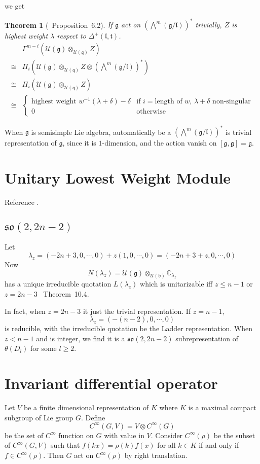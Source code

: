 \documentclass[12pt]{article}
\newtheorem{thm}{Theorem}
\def\bC{{\mathbb{C}}}
\def\aso{\mathfrak{so}}
\def\fbb{\mathfrak{b}}
\def\fll{\mathfrak{l}}
\def\fqq{\mathfrak{q}}
\def\ftt{\mathfrak{t}}
\def\fgg{\mathfrak{g}}
\def\cuu{\mathcal{U}}
\begin{document}
we get
\begin{thm}[\cite{Enright1985}~Proposition~6.2]
If $\fgg$ act on $(\bigwedge^m(\fgg/\fll))^*$ trivially,
$Z$ is highest weight $\lambda$ respect to $\Delta^+(\fll,\ftt)$. 
\[
\begin{split}
 &\Gamma^{m-i}(\cuu(\fgg)\otimes_{\cuu(\fqq)}Z)\\
\cong& \Pi_i(\cuu(\fgg)\otimes_{\cuu(\fqq)}Z \otimes (\bigwedge^m(\fgg/\fll))^*)\\
\cong& \Pi_i(\cuu(\fgg)\otimes_{\cuu(\fqq)}Z)\\
\cong& \begin{cases}
\text{highest weight } w^{-1}(\lambda+\delta)-\delta & \text{if } i=\text{length of $w$, $\lambda+\delta$ non-singular}\\
0 & \text{otherwise}  
\end{cases}
\end{split}
\]
\end{thm}
When $\fgg$ is semisimple Lie algebra, automatically be a $(\bigwedge^m(\fgg/\fll))^*$ is trivial representation of $\fgg$,
since it is $1$-dimension, and the action vanish on $[\fgg,\fgg]=\fgg$.

\section{Unitary Lowest Weight Module}
Reference \cite{Enright1983}.
\subsection{$\aso(2,2n-2)$}
Let 
\[
\lambda_z = (-2n+3, 0,\cdots, 0) + z(1, 0, \cdots, 0)
= (-2n+3+z,0, \cdots, 0)
\]
Now
\[
N(\lambda_z)=\cuu(\fgg)\otimes_{\cuu(\fbb)}\bC_{\lambda_z}
\]
has a unique irreducible quotation $L(\lambda_z)$ which is unitarizable iff $z\leq n-1$ or $z=2n-3$ 
\cite{Enright1983}~Theorem~10.4. 

In fact, when $z=2n-3$ it just the trivial representation. 
If $z= n-1$, 
\[
\lambda_{z} = (-(n-2), 0, \cdots, 0)
\]
is reducible, with the irreducible quotation be the Ladder representation. 
When $z < n-1$ and is integer,
we find it is a $\aso(2,2n-2)$ subrepresentation of $\theta(D_l)$ for some $l\geq 2$.  

\section{Invariant differential operator}

Let $V$ be a finite dimensional representation of $K$ where $K$ is a maximal
compact subgroup of Lie group $G$. 
Define
\[
C^\infty(G,V)  = V \otimes C^\infty(G)
\]
be the set of $C^\infty$ function on $G$ with value in $V$. 
Consider $C^\infty(\rho)$ be the subset of $C^\infty(G,V)$
such that $f(kx) = \rho(k)f(x)$ for all $k\in K$ 
if and only if $f\in C^\infty(\rho)$.
Then $G$ act on $C^\infty(\rho)$ by right translation.
\end{document}
